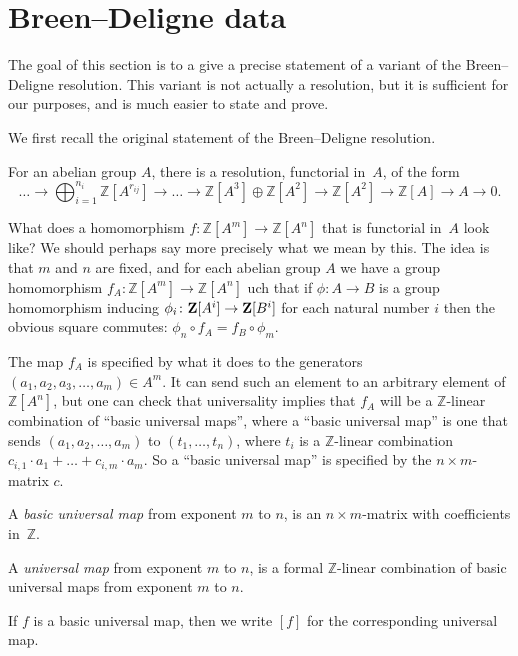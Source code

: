\section{Breen--Deligne data}

The goal of this section is to a give a precise statement of
a variant of the Breen--Deligne resolution.
This variant is not actually a resolution,
but it is sufficient for our purposes,
and is much easier to state and prove.

We first recall the original statement of the Breen--Deligne resolution.
\begin{theoremx}
  \label{BD_orig}
  For an abelian group $A$, there is a resolution, functorial in~$A$, of the form
  \[
    \ldots \to \bigoplus_{i=1}^{n_i} \mathbb Z[A^{r_{ij}}] \to \ldots
    \to \mathbb Z[A^3] \oplus \mathbb Z[A^2] \to \mathbb Z[A^2] \to \mathbb Z[A] \to A \to 0.
  \]
\end{theoremx}

What does a homomorphism $f \colon \mathbb Z[A^m] \to \mathbb Z[A^n]$
that is functorial in~$A$ look like?
We should perhaps say more precisely what we mean by this.
The idea is that $m$ and $n$ are fixed,
and for each abelian group $A$ we have a group homomorphism
$f_A\colon \mathbb Z[A^m] \to \mathbb Z[A^n]$ 
uch that if $\phi \colon A\to B$ is a group homomorphism
inducing $\phi_i \colon\mathbf{Z}[A^i]\to\mathbf{Z}[B^i]$ for each natural number $i$
then the obvious square commutes: $\phi_n \circ f_A = f_B \circ \phi_m$.

The map $f_A$ is specified by what it does to the generators
$(a_1, a_2, a_3, \dots, a_m)\in A^m$.
It can send such an element to an arbitrary element of $\mathbb Z[A^n]$,
but one can check that universality implies that $f_A$
will be a $\mathbb Z$-linear combination of ``basic universal maps'',
where a ``basic universal map'' is one that sends $(a_1, a_2, \dots, a_m)$ to $(t_1, \dots, t_n)$,
where $t_i$ is a $\mathbb Z$-linear combination $c_{i,1} \cdot a_1 + \dots + c_{i,m} \cdot a_m$.
So a ``basic universal map'' is specified by the $n \times m$-matrix $c$.

\begin{definition}
  \label{basic_universal_map}
  \leanok
  A \emph{basic universal map} from exponent $m$ to $n$,
  is an $n \times m$-matrix with coefficients in~$\mathbb Z$.
\end{definition}

\begin{definition}
  \label{universal_map}
  \leanok
  A \emph{universal map} from exponent $m$ to $n$,
  is a formal $\mathbb Z$-linear combination
  of basic universal maps from exponent $m$ to $n$.

  If $f$ is a basic universal map,
  then we write $[f]$ for the corresponding universal map.
\end{definition}

